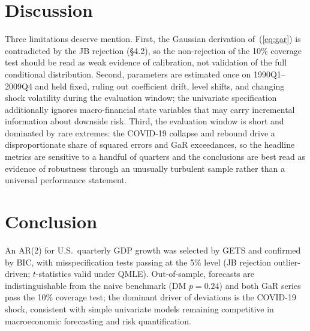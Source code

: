 \documentclass[12pt]{article}
\begin{document}




\section{Discussion}\label{sec:p1-discussion}

Three limitations deserve mention.
First, the Gaussian derivation of~(\ref{eq:gar}) is contradicted by the JB rejection (\S4.2), so the non-rejection of the 10\% coverage test should be read as weak evidence of calibration, not validation of the full conditional distribution.
\newline
Second, parameters are estimated once on 1990Q1--2009Q4 and held fixed, ruling out coefficient drift, level shifts, and changing shock volatility during the evaluation window; the univariate specification additionally ignores macro-financial state variables that may carry incremental information about downside risk.
\newline
Third, the evaluation window is short and dominated by rare extremes: the COVID-19 collapse and rebound drive a disproportionate share of squared errors and GaR exceedances, so the headline metrics are sensitive to a handful of quarters and the conclusions are best read as evidence of robustness through an unusually turbulent sample rather than a universal performance statement.




\section{Conclusion}\label{sec:p1-conclusion}

An AR(2) for U.S.\ quarterly GDP growth was selected by GETS and confirmed by BIC, with misspecification tests passing at the 5\% level (JB rejection outlier-driven; $t$-statistics valid under QMLE). Out-of-sample, forecasts are indistinguishable from the naive benchmark (DM $p=0.24$) and both GaR series pass the 10\% coverage test; the dominant driver of deviations is the COVID-19 shock, consistent with simple univariate models remaining competitive in macroeconomic forecasting and risk quantification.
\end{document}
